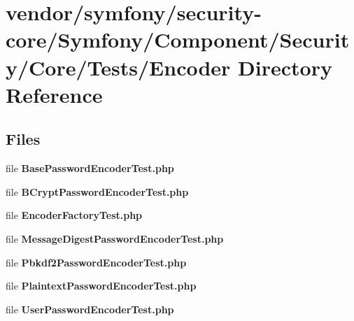 \section{vendor/symfony/security-\/core/\+Symfony/\+Component/\+Security/\+Core/\+Tests/\+Encoder Directory Reference}
\label{dir_07072f4d1ff12db0c0c4ef87cc9c47e7}
\subsection*{Files}
\begin{DoxyCompactItemize}
\item 
file {\bf Base\+Password\+Encoder\+Test.\+php}
\item 
file {\bf B\+Crypt\+Password\+Encoder\+Test.\+php}
\item 
file {\bf Encoder\+Factory\+Test.\+php}
\item 
file {\bf Message\+Digest\+Password\+Encoder\+Test.\+php}
\item 
file {\bf Pbkdf2\+Password\+Encoder\+Test.\+php}
\item 
file {\bf Plaintext\+Password\+Encoder\+Test.\+php}
\item 
file {\bf User\+Password\+Encoder\+Test.\+php}
\end{DoxyCompactItemize}
